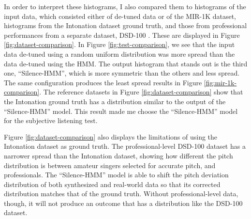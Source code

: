 In order to interpret these histograms, I also compared them to histograms of the input data, which consisted either of de-tuned data or of the MIR-1K dataset, histograms from the Intonation dataset ground truth, and those from professional performances from a separate dataset, DSD-100 \cite{SiSEC16}. These are displayed in Figure \ref{fig:dataset-comparison}. In Figure \ref{fig:test-comparison}, we see that the input data de-tuned using a random uniform distribution was more spread than the data de-tuned using the HMM. The output histogram that stands out is the third one, ``Silence-HMM'', which is more symmetric than the others and less spread. The same configuration produces the least spread results in Figure \ref{fig:mir-1k-comparison}. The reference datasets in Figure \ref{fig:dataset-comparison} show that the Intonation ground truth has a distribution similar to the output of the ``Silence-HMM'' model. This result made me choose the ``Silence-HMM'' model for the subjective listening test.

Figure \ref{fig:dataset-comparison} also displays the limitations of using the Intonation dataset as ground truth. The professional-level DSD-100 dataset has a narrower spread than the Intonation dataset, showing how different the pitch distribution is between amateur singers selected for accurate pitch, and professionals. The ``Silence-HMM'' model is able to shift the pitch deviation distribution of both synthesized and real-world data so that its corrected distribution matches that of the ground truth. Without professional-level data, though, it will not produce an outcome that has a distribution like the DSD-100 dataset.

